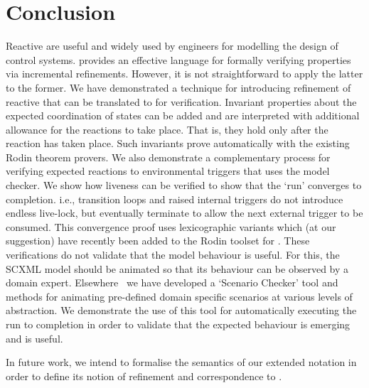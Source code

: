 \section{Conclusion}
\label{sec:conc}

Reactive \SCs are useful and widely used by engineers for modelling the design of control systems. 
\EventB provides an effective language for formally verifying properties via incremental refinements.
However, it is not straightforward to apply the latter to the former.
We have demonstrated a technique for introducing refinement of reactive \SCs that can be translated to \EventB for verification.
Invariant properties about the expected coordination of states can be added and are interpreted with additional allowance for the reactions to take place.
That is, they hold only after the reaction has taken place.
Such invariants prove automatically with the existing Rodin theorem provers.
We also demonstrate a complementary process for verifying expected reactions to environmental triggers that uses the \LTL model checker.
We show how liveness can be verified  to show that the `run' converges to completion.
i.e., transition loops and raised internal triggers do not introduce endless live-lock, but eventually terminate to allow the next external trigger to be consumed.
This convergence proof uses lexicographic variants which (at our suggestion) have recently been added to the Rodin toolset for \EventB.
These verifications do not validate that the model behaviour is useful.
For this, the SCXML model should be animated so that its behaviour can be observed by a domain expert.
Elsewhere~\cite{snook20JSA} we have developed a `Scenario Checker' tool and methods for animating pre-defined domain specific scenarios at various levels of abstraction.
We demonstrate the use of this tool for automatically executing the run to completion in order to validate that the expected behaviour is emerging and is useful.

In future work, we intend to formalise the semantics of our extended \SCXML notation in order to define its notion of refinement and correspondence to \EventB. 



